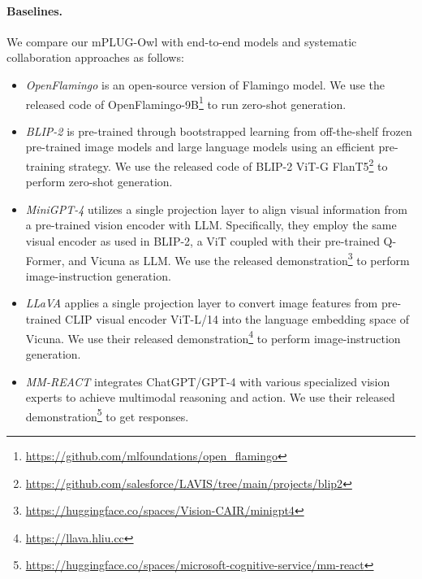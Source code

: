 \documentclass{article}
\newcommand{\modelname}{mPLUG-Owl\xspace}
\begin{document}
\paragraph{Baselines.} 
We compare our \modelname with end-to-end models and systematic collaboration approaches as follows:
\begin{itemize}
    \item \textit{OpenFlamingo} \citep{openflamingo} is an open-source version of Flamingo \citep{flamingo} model. We use the released code of OpenFlamingo-9B\footnote{\href{https://github.com/mlfoundations/open_flamingo}{https://github.com/mlfoundations/open\_flamingo}} to run zero-shot generation.
    \item \textit{BLIP-2} \citep{blip2} is pre-trained through bootstrapped learning from off-the-shelf frozen pre-trained image models and large language models using an efficient pre-training strategy. We use the released code of BLIP-2 ViT-G FlanT5\footnote{\href{https://github.com/salesforce/LAVIS/tree/main/projects/blip2}{https://github.com/salesforce/LAVIS/tree/main/projects/blip2}} to perform zero-shot generation.
    \item \textit{MiniGPT-4} \citep{minigpt4} utilizes a single projection layer to align visual information from a pre-trained vision encoder with LLM. Specifically, they employ the same visual encoder as used in BLIP-2, a ViT coupled with their pre-trained Q-Former, and Vicuna as LLM.
    We use the released demonstration\footnote{\href{https://huggingface.co/spaces/Vision-CAIR/minigpt4}{https://huggingface.co/spaces/Vision-CAIR/minigpt4}} to perform image-instruction generation.
    \item \textit{LLaVA} \citep{llava} applies a single projection layer to convert image features from pre-trained CLIP visual encoder ViT-L/14 into the language embedding space of Vicuna. We use their released demonstration\footnote{\href{https://llava.hliu.cc}{https://llava.hliu.cc}} to perform image-instruction generation.
    \item \textit{MM-REACT} \citep{mmreact} integrates ChatGPT/GPT-4 with various specialized vision experts to achieve multimodal reasoning and action. We use their released demonstration\footnote{\href{https://huggingface.co/spaces/microsoft-cognitive-service/mm-react}{https://huggingface.co/spaces/microsoft-cognitive-service/mm-react}} to get responses. 
\end{itemize}
\end{document}
